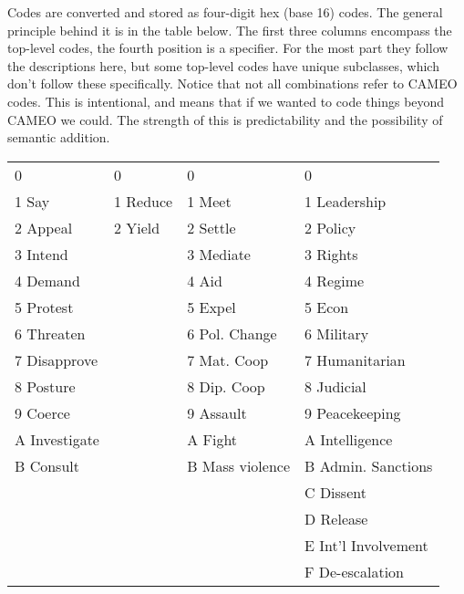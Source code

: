 \documentclass[11pt]{article}
\begin{document}
Codes are converted and stored as four-digit hex (base 16) codes.
The general principle behind it is in the table below. The 
first three columns encompass the top-level codes, the fourth position is a specifier. For the 
most part they follow the descriptions here, but some top-level codes have unique subclasses,
which don't follow these specifically. Notice that not all 
combinations refer to CAMEO codes. This is intentional, and means that if we 
wanted to code things beyond CAMEO we could. The strength of this is 
predictability and the possibility of semantic addition.

\vspace{12mm}
\begin{tabular}{llll}
             0        &        0   &       0               &        0 \\
            1 Say  &      1 Reduce &   1 Meet   &               1 Leadership \\
            2 Appeal     &    2 Yield  &  2 Settle      &          2 Policy\\
            3 Intend     &~   &            3 Mediate    &           3 Rights\\
            4 Demand      &~     &        4 Aid               &    4 Regime\\
            5 Protest	  &~    &          5 Expel         &        5 Econ\\
            6 Threaten              &~     &    6 Pol. Change    &       6 Military\\
            7 Disapprove    &~    &        7 Mat. Coop  &           7 Humanitarian\\
            8 Posture       &~        &    8 Dip. Coop     &        8 Judicial\\
            9 Coerce          &~      &    9 Assault	        &    9 Peacekeeping\\
            A Investigate &~         &     A Fight		  &  	A Intelligence\\
            B Consult  	&~	&   B Mass violence	&	B Admin. Sanctions\\
           ~ 	&~	&				  ~  			       &     C Dissent\\
           ~ 	&~	&				 ~   				  &      D Release\\
            ~	&~&					~	     		       &     E Int'l Involvement\\
           ~ &~&						  ~ 		            & F De-escalation\\

  
\end{tabular}
\end{document}
